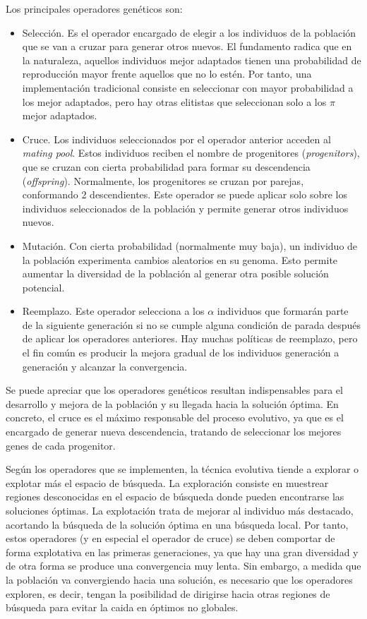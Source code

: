 \documentclass[spanish,a4paper,12pt,twoside]{report}
\begin{document}
  Los principales operadores genéticos son:
  \begin{itemize}
    \item Selección. Es el operador encargado de elegir a los individuos de la población que se van a cruzar para generar otros nuevos. El fundamento radica que en la naturaleza, aquellos individuos mejor adaptados tienen una probabilidad de reproducción mayor frente aquellos que no lo estén. Por tanto, una implementación tradicional consiste en seleccionar con mayor probabilidad a los mejor adaptados, pero hay otras elitistas que seleccionan solo a los $\pi$ mejor adaptados.
    \item Cruce. Los individuos seleccionados por el operador anterior acceden al \emph{mating pool}. Estos individuos reciben el nombre de progenitores (\emph{progenitors}), que se cruzan con cierta probabilidad para formar su descendencia (\emph{offspring}). Normalmente, los progenitores se cruzan por parejas, conformando 2 descendientes. Este operador se puede aplicar solo sobre los individuos seleccionados de la población y permite generar otros individuos nuevos. 
    \item Mutación. Con cierta probabilidad (normalmente muy baja), un individuo de la población experimenta cambios aleatorios en su genoma. Esto permite aumentar la diversidad de la población al generar otra posible solución potencial.
    \item Reemplazo. Este operador selecciona a los $\alpha$ individuos que formarán parte de la siguiente generación si no se cumple alguna condición de parada después de aplicar los operadores anteriores. Hay muchas políticas de reemplazo, pero el fin común es producir la mejora gradual de los individuos generación a generación y alcanzar la convergencia.
  \end{itemize} \par
  Se puede apreciar que los operadores genéticos resultan indispensables para el desarrollo y mejora de la población y su llegada hacia la solución óptima. En concreto, el cruce es el máximo responsable del proceso evolutivo, ya que es el encargado de generar nueva descendencia, tratando de seleccionar los mejores genes de cada progenitor. \par
  Según los operadores que se implementen, la técnica evolutiva tiende a explorar o explotar más el espacio de búsqueda. La exploración consiste en muestrear regiones desconocidas en el espacio de búsqueda donde pueden encontrarse las soluciones óptimas. La explotación trata de mejorar al individuo más destacado, acortando la búsqueda de la solución óptima en una búsqueda local. Por tanto, estos operadores (y en especial el operador de cruce) se deben comportar de forma explotativa en las primeras generaciones, ya que hay una gran diversidad y de otra forma se produce una convergencia muy lenta. Sin embargo, a medida que la población va convergiendo hacia una solución, es necesario que los operadores exploren, es decir, tengan la posibilidad de dirigirse hacia otras regiones de búsqueda para evitar la caida en óptimos no globales. \par
  
\end{document}
